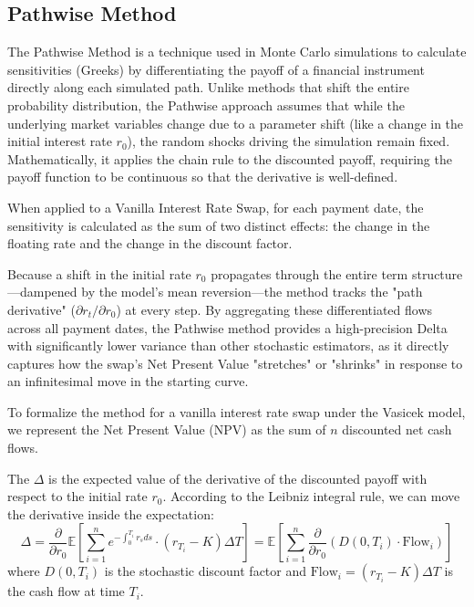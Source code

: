 \subsection{Pathwise Method}

The Pathwise Method is a technique used in Monte Carlo simulations to calculate sensitivities (Greeks) by differentiating the payoff of a financial instrument directly along each simulated path. Unlike methods that shift the entire probability distribution, the Pathwise approach assumes that while the underlying market variables change due to a parameter shift (like a change in the initial interest rate $r_0$), the random shocks driving the simulation remain fixed. Mathematically, it applies the chain rule to the discounted payoff, requiring the payoff function to be continuous so that the derivative is well-defined.

When applied to a Vanilla Interest Rate Swap, for each payment date, the sensitivity is calculated as the sum of two distinct effects: the change in the floating rate and the change in the discount factor.

Because a shift in the initial rate $r_0$ propagates through the entire term structure—dampened by the model's mean reversion—the method tracks the "path derivative" ($\partial r_t/\partial r_0$) at every step. By aggregating these differentiated flows across all payment dates, the Pathwise method provides a high-precision Delta with significantly lower variance than other stochastic estimators, as it directly captures how the swap's Net Present Value "stretches" or "shrinks" in response to an infinitesimal move in the starting curve.

To formalize the method for a vanilla interest rate swap under the Vasicek model, we represent the Net Present Value (NPV) as the sum of $n$ discounted net cash flows.

The $\Delta$ is the expected value of the derivative of the discounted payoff with respect to the initial rate $r_0$. According to the Leibniz integral rule, we can move the derivative inside the expectation:
\begin{equation}
\Delta=\frac{\partial}{\partial r_0}\mathbb{E}\left[\sum_{i=1}^n e^{-\int_0^{T_i} r_s ds}\cdot(r_{T_i}-K)\Delta T\right]=\mathbb{E}\left[\sum_{i=1}^n\frac{\partial}{\partial r_0}(D(0,T_i)\cdot \text{Flow}_i)\right]
\end{equation}
where $D(0,T_i)$ is the stochastic discount factor and $\text{Flow}_i=(r_{T_i}-K)\Delta T$ is the cash flow at time $T_i$.

